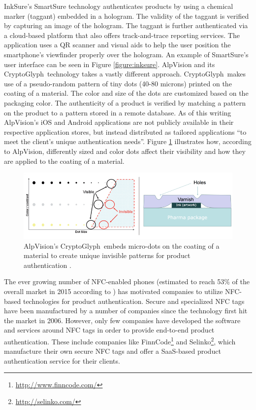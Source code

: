 \documentclass[thesis.tex]{subfiles}
\begin{document}
InkSure's SmartSure technology authenticates products by using a chemical marker (taggant) embedded in a hologram. The validity of the taggant is verified by capturing an image of the hologram. The taggant is further authenticated via a cloud-based platform that also offers track-and-trace reporting services. The application uses a QR scanner and visual aids to help the user position the smartphone's viewfinder properly over the hologram. \cite{inksure} An example of SmartSure's user interface can be seen in Figure \ref{figure:inksure}. AlpVision and its CryptoGlyph\textregistered\ technology takes a vastly different approach. CryptoGlyph\textregistered\ makes use of a pseudo-random pattern of tiny dots (40-80 microns) printed on the coating of a material. The color and size of the dots are customized based on the packaging color. The authenticity of a product is verified by matching a pattern on the product to a pattern stored in a remote database. As of this writing AlpVision's iOS and Android applications are not publicly available in their respective application stores, but instead distributed as tailored applications ``to meet the client's unique authentication needs''. \cite{alpvision} Figure \ref{figure:alpvision} illustrates how, according to AlpVision, differently sized and color dots affect their visibility and how they are applied to the coating of a material.

\begin{figure}[hb]
\centering \includegraphics[width=\textwidth]{images/existing_solutions/cryptoglyph}
\caption{AlpVision's CryptoGlyph\textregistered\ embeds micro-dots on the coating of a material to create unique invisible patterns for product authentication \cite{alpvision}. \label{figure:alpvision}}
\end{figure}

The ever growing number of NFC-enabled phones (estimated to reach 53\% of the overall market in 2015 according to \cite{frost-sullivan}) has motivated companies to utilize NFC-based technologies for product authentication. Secure and specialized NFC tags have been manufactured by a number of companies since the technology first hit the market in 2006. However, only few companies have developed the software and services around NFC tags in order to provide end-to-end product authentication. These include companies like FinnCode\footnote{\url{http://www.finncode.com/}} and Selinko\footnote{\url{http://selinko.com/}}, which manufacture their own secure NFC tags and offer a SaaS-based product authentication service for their clients.
\end{document}
